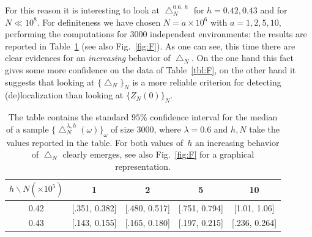 \documentclass[reqno,11pt]{amsart}
\numberwithin{equation}{section}
\newcommand{\go}{\omega}
\newcommand{\gl}{\lambda}
\begin{document}
For this reason it is interesting to look at $\bigtriangleup_N^{0.6,\,h}$ for $h=0.42, 0.43$ and for $N \ll 10^8$. For definiteness we have chosen $N=a\times 10^6$ with $a=1,2,5,10$, performing the computations for $3000$ independent environments: the results are reported in Table~\ref{tbl:F2} (see also Fig.~\ref{fig:F}). As one can see, this time there are clear evidences for an \textsl{increasing} behavior of $\bigtriangleup_N$. On the one hand this fact gives some more confidence on the data of Table~\ref{tbl:F}, on the other hand it suggests that looking at $\{\bigtriangleup_N\}_N$ is a more reliable criterion for detecting (de)localization than looking at $\{Z_N(0)\}_N$.

\begin{table}[h]
\begin{center}
\begin{tabular}{|c||c|c|c|c|}
\hline
$h \backslash N(\times 10^5) $ & 1 & 2 & 5 & 10\\
\hline
\hline
0.42 & [.351, 0.382] & [.480, 0.517] & [.751, 0.794] & [1.01, 1.06] \\
\hline
0.43 & [.143, 0.155] & [.165, 0.180] & [.197, 0.215] & [.236, 0.264] \\
\hline
\end{tabular}
\end{center}
\caption{ \label{tbl:F2}
The table contains the standard $95\%$ confidence interval for the median of a sample $\{\bigtriangleup _N^{\gl,h}(\go)\}_{\go}$ of size 3000, where $\gl=0.6$ and $h,N$ take the values reported in the table. For both values of~$h$ an increasing behavior of $\bigtriangleup_{N}$ clearly emerges, see also Fig.~\ref{fig:F} for a graphical representation.}
\end{table}
\end{document}

